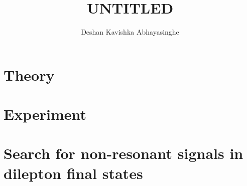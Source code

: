 \documentclass[11pt,a4paper,hyperpdf,oneside,nobind]{AJBthesis}
\title{\texorpdfstring{UNTITLED}{UNTITLED}}
\author{Deshan Kavishka Abhayasinghe}
\begin{document}
\begin{frontmatter}
    
\end{frontmatter}

\begin{mainmatter}
    \linenumbers
    \part{Theory}
    \part{Experiment}
    \part{Search for non-resonant signals in dilepton final states}
     
\end{mainmatter}

\clearpage

\begin{backmatter}
     
     
        
\end{backmatter}

\let\svaddcontentsline\addcontentsline
    \renewcommand\addcontentsline[3]{%
        \edef\qtest{#1}%
        \def\qmatch{lof}%
        \ifx\qmatch\qtest\else%
            \def\qmatch{lot}%
            \ifx\qmatch\qtest\else%
                \svaddcontentsline{#1}{#2}{#3}%
        \fi\fi%
    }

\begin{appendices}
\end{appendices}
\end{document}
